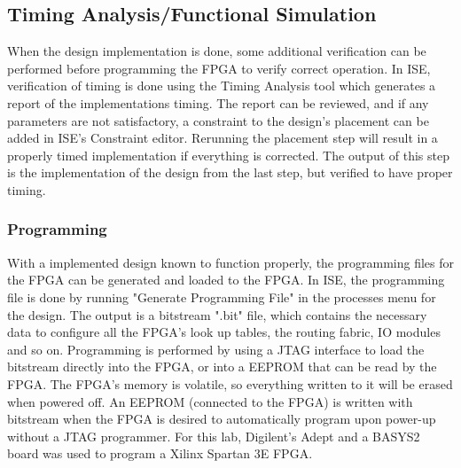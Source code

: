 \documentclass[12pt]{article}
\begin{document}
\subsection*{Timing Analysis/Functional Simulation}
When the design implementation is done, some additional verification can be performed before programming the FPGA to verify correct operation. In ISE, verification of timing is done using the Timing Analysis tool which generates a report of the implementations timing. The report can be reviewed, and if any parameters are not satisfactory, a constraint to the design's placement can be added in ISE's Constraint editor. Rerunning the placement step will result in a properly timed implementation if everything is corrected. The output of this step is the implementation of the design from the last step, but verified to have proper timing.
\subsubsection*{Programming}
With a implemented design known to function properly, the programming files for the FPGA can be generated and loaded to the FPGA. In ISE, the programming file is done by running "Generate Programming File" in the processes menu for the design. The output is a bitstream ".bit" file, which contains the necessary data to configure all the FPGA's look up tables, the routing fabric, IO modules and so on. Programming is performed by using a JTAG interface to load the bitstream directly into the FPGA, or into a EEPROM that can be read by the FPGA. The FPGA's memory is volatile, so everything written to it will be erased when powered off. An EEPROM (connected to the FPGA) is written with bitstream when the FPGA is desired to automatically program upon power-up without a JTAG programmer. For this lab, Digilent's Adept and a BASYS2 board was used to program a Xilinx Spartan 3E FPGA.
\end{document}
